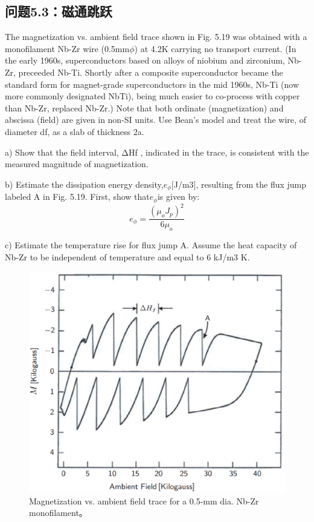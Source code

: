 \subsection{问题5.3：磁通跳跃}
The magnetization vs. ambient field trace shown in Fig. 5.19 was obtained with a
monofilament Nb-Zr wire (0.5mm$\phi$) at 4.2K carrying no transport current. (In
the early 1960s, superconductors based on alloys of niobium and zirconium, Nb-Zr,
preceeded Nb-Ti. Shortly after a composite superconductor became the standard
form for magnet-grade superconductors in the mid 1960s, Nb-Ti (now more commonly
designated NbTi), being much easier to co-process with copper than Nb-Zr,
replaced Nb-Zr.) Note that both ordinate (magnetization) and abscissa (field) are
given in non-SI units. Use Bean’s model and treat the wire, of diameter df, as a
slab of thickness 2a.

a) Show that the field interval, ΔHf , indicated in the trace, is consistent with
the measured magnitude of magnetization.

b) Estimate the dissipation energy density,$e_{\phi}$[J/m3], resulting from the flux
jump labeled A in Fig. 5.19. First, show that$e_{\phi}$is given by:
\begin{equation}%
e_{\phi}=\frac{(\mu_{o}J_{p})^{2}}{6\mu_{o}}
\end{equation}

c) Estimate the temperature rise for flux jump A. Assume the heat capacity of
Nb-Zr to be independent of temperature and equal to 6 kJ/m3 K.

\begin{figure}[htbp]
	\centering
	\includegraphics[scale=0.5]{chpt5/figs/fig5.19.eps}
	\caption{Magnetization vs. ambient field trace for a 0.5-mm dia. Nb-Zr monofilament。}
\end{figure}


